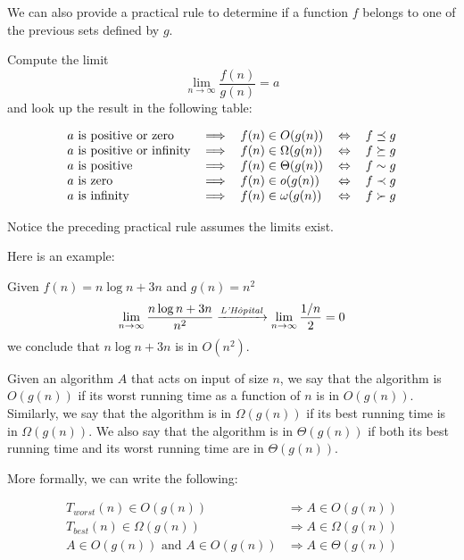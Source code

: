 \documentclass[justified,sixbynine]{tufte-book}
\theoremstyle{plain}%
\theoremstyle{definition}
\theoremstyle{remark}
\begin{document}
\begin{fullwidth}
We can also provide a practical rule to determine if a function $f$ belongs to one of the previous sets defined by $g$.

Compute the limit
\begin{equation}
\lim_{n\rightarrow \infty }\frac{f(n)}{g(n)}=a
\end{equation}
and look up the result in the following table:

\begin{equation}
\begin{tabular}{lllll}
$a$ is positive or zero & $\Longrightarrow $ & $f(n)\in O(g(n))$ & $%
\Leftrightarrow $ & $f\preceq g$ \\
$a$ is positive or infinity & $\Longrightarrow $ & $f(n)\in \Omega (g(n))$ & $%
\Leftrightarrow $ & $f\succeq g$ \\
$a$ is positive & $\Longrightarrow $ & $f(n)\in \Theta (g(n))$ & $%
\Leftrightarrow $ & $f\sim g$ \\
$a$ is zero & $\Longrightarrow $ & $f(n)\in o(g(n))$ & $\Leftrightarrow $ & $%
f\prec g$ \\
$a$ is infinity & $\Longrightarrow $ & $f(n)\in \omega (g(n))$ & $%
\Leftrightarrow $ & $f\succ g$%
\end{tabular}
\end{equation}

Notice the preceding practical rule assumes the limits exist.

Here is an example:

Given $f(n) = n\log n+3n$ and $g(n) = n^2$
\begin{equation}
\lim_{n\rightarrow \infty }\frac{n\log n+3n}{n^2} \xrightarrow{\text{\emph{L'H\^{o}pital}}%
} \lim_{n\rightarrow \infty }\frac{1/n}2=0
\end{equation}
we conclude that $n\log n+3n$ is in $O(n^2)$.



Given an algorithm $A$ that acts on input of size $n$, we say that the algorithm is $O(g(n))$ if its worst running time as a function of $n$ is in $O(g(n))$. Similarly, we say that the algorithm is in $\Omega(g(n))$ if its best running time is in $\Omega(g(n))$. We also say that the algorithm is in $ \Theta(g(n))$ if both its best running time and its worst running time are in  $\Theta(g(n))$.

More formally, we can write the following:

\begin{align}
T_{worst}(n) \in O(g(n)) &\Rightarrow A \in O(g(n)) \\
T_{best}(n) \in \Omega(g(n)) &\Rightarrow A \in \Omega(g(n)) \\
A \in O(g(n)) \text{ and } A \in O(g(n))  &\Rightarrow A \in \Theta(g(n))
\end{align}


\end{fullwidth}
\end{document}
